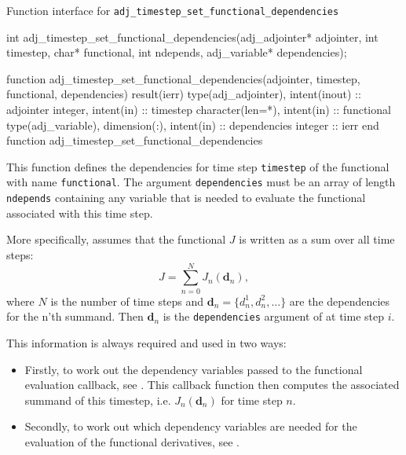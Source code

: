 \begin{boxwithtitle}{Function interface for \texttt{adj_timestep_set_functional_dependencies}}
\begin{minipage}{\columnwidth}
\begin{ccode}
  int adj_timestep_set_functional_dependencies(adj_adjointer* adjointer, 
                   int timestep, char* functional, int ndepends, 
                   adj_variable* dependencies);
\end{ccode}
\begin{fortrancode}
  function adj_timestep_set_functional_dependencies(adjointer, timestep, 
                                  functional, dependencies) result(ierr)
    type(adj_adjointer), intent(inout) :: adjointer
    integer, intent(in) :: timestep
    character(len=*), intent(in) :: functional
    type(adj_variable), dimension(:), intent(in) :: dependencies
    integer :: ierr
  end function adj_timestep_set_functional_dependencies
\end{fortrancode}
\end{minipage}
\end{boxwithtitle}

This function defines the dependencies for time step \texttt{timestep} of the functional with name \texttt{functional}.
The argument \texttt{dependencies} must be an array of length \texttt{ndepends} containing any variable that is needed to evaluate the functional associated with this time step.

More specifically, \libadjoint assumes that the functional $J$ is written as a sum over all time steps:
\begin{equation}
J = \sum_{n=0}^N J_n(\mathbf d_n),
\label{eq:functional_as_sum}
\end{equation}
where $N$ is the number of time steps and $\mathbf d_n=\{d_n^1, d_n^2, ...\}$ are the dependencies for the n'th summand.
Then $\mathbf d_n$ is the \texttt{dependencies} argument of   at time step $i$.

This information is always required and used in two ways: 
\begin{itemize}
\item Firstly, to work out the dependency variables passed to the functional evaluation callback, see .
This callback function then computes the associated summand of this timestep, i.e. $J_n(\mathbf d_n)$ for time step $n$.
\item Secondly, to work out which dependency variables are needed for the evaluation of the functional derivatives, see .
\end{itemize}

